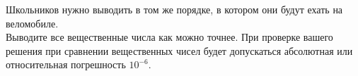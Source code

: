 \begin{problem}
Школьников нужно выводить в том же порядке, в котором они будут ехать на веломобиле.\\

Выводите все вещественные числа как можно точнее. При проверке вашего решения при сравнении вещественных чисел будет допускаться абсолютная или относительная погрешность $10^{-6}$.

\Examples

\begin{example}
%
\end{example}
\end{problem}
